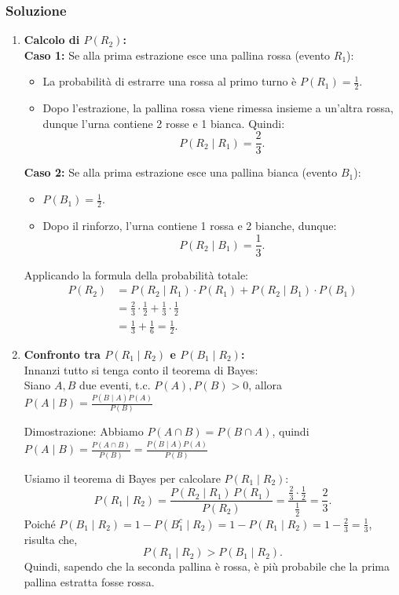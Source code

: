 \subsubsection{Soluzione}
\begin{enumerate}[label=(\arabic*)]
    \item \textbf{Calcolo di \(P(R_2)\):}\\[1mm]
    \textbf{Caso 1:} Se alla prima estrazione esce una pallina rossa (evento \(R_1\)):
    \begin{itemize}
        \item La probabilità di estrarre una rossa al primo turno è \(P(R_1)=\frac{1}{2}\).
        \item Dopo l’estrazione, la pallina rossa viene rimessa insieme a un’altra rossa, dunque l’urna contiene 2 rosse e 1 bianca. Quindi:
        \[
        P(R_2 \mid R_1)=\frac{2}{3}.
        \]
    \end{itemize}
    \textbf{Caso 2:} Se alla prima estrazione esce una pallina bianca (evento \(B_1\)):
    \begin{itemize}
        \item \(P(B_1)=\frac{1}{2}\).
        \item Dopo il rinforzo, l’urna contiene 1 rossa e 2 bianche, dunque:
        \[
        P(R_2 \mid B_1)=\frac{1}{3}.
        \]
    \end{itemize}
    Applicando la formula della probabilità totale:
    \[
    \begin{split}
    P(R_2) &= P(R_2 \mid R_1) \cdot P(R_1) + P(R_2 \mid B_1) \cdot P(B_1) \\
    &= \frac{2}{3}\cdot\frac{1}{2} + \frac{1}{3}\cdot\frac{1}{2} \\
    &= \frac{1}{3} + \frac{1}{6} = \frac{1}{2}.
    \end{split}
    \]
    
    \item \textbf{Confronto tra \(P(R_1 \mid R_2)\) e \(P(B_1 \mid R_2)\):}\\[1mm]
    
    Innanzi tutto si tenga conto il teorema di Bayes:\\ 
    Siano $A,B$ due eventi, t.c. $P(A), P(B)>0$, allora $P(A\mid B) = \frac{P(B\mid A) P(A)}{P(B)}$

    Dimostrazione: 
    Abbiamo $P(A\cap B) = P(B\cap A)$, quindi $P(A\mid B) = \frac{P(A\cap B)}{P(B)} = \frac{P(B\mid A)P(A)}{P(B)}$


    Usiamo il teorema di Bayes per calcolare \(P(R_1 \mid R_2)\):
    \[
    P(R_1 \mid R_2) = \frac{P(R_2 \mid R_1) \, P(R_1)}{P(R_2)} 
    = \frac{\frac{2}{3} \cdot \frac{1}{2}}{\frac{1}{2}}
    = \frac{2}{3}.
    \]
    Poiché \(P(B_1 \mid R_2) =1- P(B_1^c \mid R_2) =1 - P(R_1 \mid R_2) = 1 - \frac{2}{3} = \frac{1}{3}\), risulta che,
    \[
    P(R_1 \mid R_2) > P(B_1 \mid R_2).
    \]
    Quindi, sapendo che la seconda pallina è rossa, è più probabile che la prima pallina estratta fosse rossa.
\end{enumerate}



